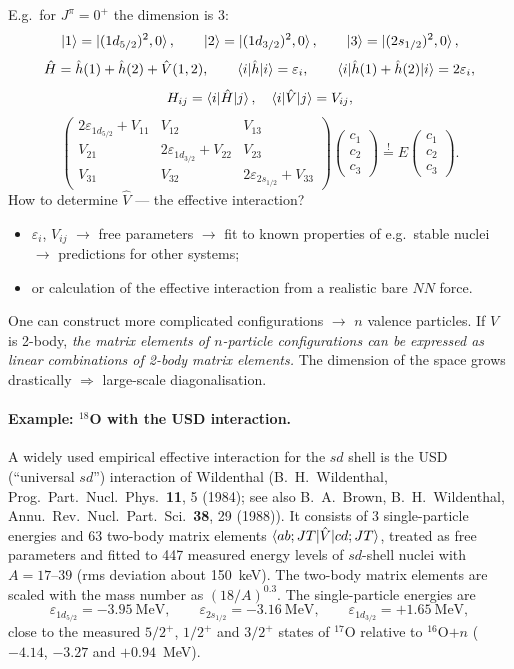 \documentclass[11pt,a4paper]{article}
\newcommand{\op}[1]{\hat{#1}}
\begin{document}
E.g.\ for $J^\pi=0^+$ the dimension is 3:
\[
\ket1=\ket{(1d_{5/2})^2,0},\qquad \ket2=\ket{(1d_{3/2})^2,0},\qquad \ket3=\ket{(2s_{1/2})^2,0},
\]
\[
\op H=\op h(1)+\op h(2)+\op V(1,2),\qquad
\braket{i|\op h|i}=\varepsilon_i,\qquad \braket{i|\op h(1)+\op h(2)|i}=2\varepsilon_i,
\]
\[
H_{ij}=\braket{i|\op H|j},\quad \braket{i|\op V|j}=V_{ij},
\]
\[
\begin{pmatrix}
2\varepsilon_{1d_{5/2}}+V_{11} & V_{12} & V_{13}\\
V_{21} & 2\varepsilon_{1d_{3/2}}+V_{22} & V_{23}\\
V_{31} & V_{32} & 2\varepsilon_{2s_{1/2}}+V_{33}
\end{pmatrix}
\begin{pmatrix}c_1\\c_2\\c_3\end{pmatrix}
\overset{!}{=}E\begin{pmatrix}c_1\\c_2\\c_3\end{pmatrix}.
\]
How to determine $\op V$ --- the effective interaction?
\begin{itemize}
\item $\varepsilon_i$, $V_{ij}$ $\to$ free parameters $\to$ fit to known properties of e.g.\ stable nuclei $\to$ predictions for other systems;
\item or calculation of the effective interaction from a realistic bare $NN$ force.
\end{itemize}
One can construct more complicated configurations $\to$ $n$ valence particles. If $V$ is 2-body, \emph{the matrix elements of $n$-particle configurations can be expressed as linear combinations of 2-body matrix elements.} The dimension of the space grows drastically $\Rightarrow$ large-scale diagonalisation.

\paragraph{Example: ${}^{18}$O with the USD interaction.}
A widely used empirical effective interaction for the $sd$ shell is the USD (``universal $sd$'') interaction of Wildenthal (B.~H.~Wildenthal, Prog.\ Part.\ Nucl.\ Phys.\ \textbf{11}, 5 (1984); see also B.~A.~Brown, B.~H.~Wildenthal, Annu.\ Rev.\ Nucl.\ Part.\ Sci.\ \textbf{38}, 29 (1988)). It consists of 3 single-particle energies and 63 two-body matrix elements $\braket{ab;JT|\op V|cd;JT}$, treated as free parameters and fitted to 447 measured energy levels of $sd$-shell nuclei with $A=17$--$39$ (rms deviation about 150~keV). The two-body matrix elements are scaled with the mass number as $(18/A)^{0.3}$. The single-particle energies are
\[
\varepsilon_{1d_{5/2}}=-3.95~\text{MeV},\qquad
\varepsilon_{2s_{1/2}}=-3.16~\text{MeV},\qquad
\varepsilon_{1d_{3/2}}=+1.65~\text{MeV},
\]
close to the measured $5/2^+$, $1/2^+$ and $3/2^+$ states of ${}^{17}$O relative to ${}^{16}$O$+n$ ($-4.14$, $-3.27$ and $+0.94$~MeV).
\end{document}
